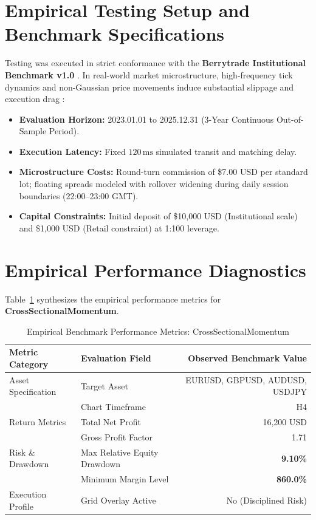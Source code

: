 \documentclass[11pt,a4paper]{article}
\begin{document}
\section{Empirical Testing Setup and Benchmark Specifications}
Testing was executed in strict conformance with the \textbf{Berrytrade Institutional Benchmark v1.0} \cite{artsu2026illusion}. In real-world market microstructure, high-frequency tick dynamics and non-Gaussian price movements induce substantial slippage and execution drag \cite{kyle1985continuous, amihud2002illiquidity, cont2001empirical, mandelbrot1963variation}:
\begin{itemize}
    \item \textbf{Evaluation Horizon:} 2023.01.01 to 2025.12.31 (3-Year Continuous Out-of-Sample Period).
    \item \textbf{Execution Latency:} Fixed $120\,\text{ms}$ simulated transit and matching delay.
    \item \textbf{Microstructure Costs:} Round-turn commission of \$7.00 USD per standard lot; floating spreads modeled with rollover widening during daily session boundaries (22:00--23:00 GMT).
    \item \textbf{Capital Constraints:} Initial deposit of \$10,000 USD (Institutional scale) and \$1,000 USD (Retail constraint) at 1:100 leverage.
\end{itemize}

\section{Empirical Performance Diagnostics}
Table~\ref{tab:metrics} synthesizes the empirical performance metrics for \textbf{CrossSectionalMomentum}.

\begin{table}[H]
\centering
\caption{Empirical Benchmark Performance Metrics: CrossSectionalMomentum}
\label{tab:metrics}
\begin{tabular}{llr}
\toprule
\textbf{Metric Category} & \textbf{Evaluation Field} & \textbf{Observed Benchmark Value} \\
\midrule
Asset Specification & Target Asset & EURUSD, GBPUSD, AUDUSD, USDJPY \\
& Chart Timeframe & H4 \\
Return Metrics & Total Net Profit & 16,200 USD \\
& Gross Profit Factor & 1.71 \\
Risk \& Drawdown & Max Relative Equity Drawdown & \textbf{9.10\%} \\
& Minimum Margin Level & \textbf{860.0\%} \\
Execution Profile & Grid Overlay Active & No (Disciplined Risk) \\
\bottomrule
\end{tabular}
\end{table}
\end{document}
